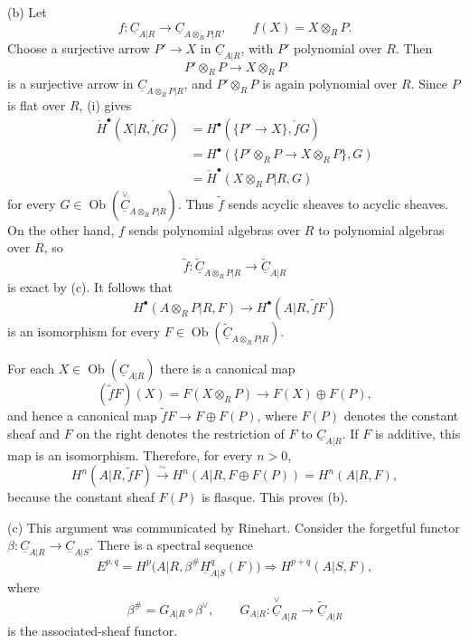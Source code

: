 (b) Let
\[
 f:\underline C_{A|R}\longrightarrow
 \underline C_{A\otimes_RP|R},
 \qquad f(X)=X\otimes_RP.
\]
Choose a surjective arrow $P'\longrightarrow X$ in
$\underline C_{A|R}$, with $P'$ polynomial over $R$. Then
\[
 P'\otimes_RP\longrightarrow X\otimes_RP
\]
is a surjective arrow in $\underline C_{A\otimes_RP|R}$, and
$P'\otimes_RP$ is again polynomial over $R$. Since $P$ is flat
over $R$, (i) gives
\begin{align*}
 \check H^{\bullet}(X|R,\check fG)
 &=H^{\bullet}(\{P'\longrightarrow X\},\check fG)\\
 &=H^{\bullet}(\{P'\otimes_RP\longrightarrow X\otimes_RP\},G)\\
 &=\check H^{\bullet}(X\otimes_RP|R,G)
\end{align*}
for every
$G\in\operatorname{Ob}(\overset{\vee}{\underline C}_{A\otimes_RP|R})$.
Thus $\widetilde f$ sends acyclic sheaves to acyclic sheaves. On
the other hand, $f$ sends polynomial algebras over $R$ to
polynomial algebras over $R$, so
\[
 \widetilde f:\widetilde{\underline C}_{A\otimes_RP|R}
 \longrightarrow\widetilde{\underline C}_{A|R}
\]
is exact by (c). It follows that
\[
 H^{\bullet}(A\otimes_RP|R,F)
 \longrightarrow H^{\bullet}(A|R,\widetilde fF)
\]
is an isomorphism for every
$F\in\operatorname{Ob}(\widetilde{\underline C}_{A\otimes_RP|R})$.

For each $X\in\operatorname{Ob}(\underline C_{A|R})$ there is a
canonical map
\[
 (\widetilde fF)(X)=F(X\otimes_RP)
 \longrightarrow F(X)\oplus F(P),
\]
and hence a canonical map
$\widetilde fF\longrightarrow F\oplus F(P)$, where $F(P)$ denotes
the constant sheaf and $F$ on the right denotes the restriction of
$F$ to $\underline C_{A|R}$. If $F$ is additive, this map is an
isomorphism. Therefore, for every $n>0$,
\[
 H^n(A|R,\widetilde fF)
 \xrightarrow{\ \sim\ }
 H^n(A|R,F\oplus F(P))=H^n(A|R,F),
\]
because the constant sheaf $F(P)$ is flasque. This proves (b).


(c) This argument was communicated by Rinehart. Consider the
forgetful functor
$\beta:\underline C_{A|R}\longrightarrow\underline C_{A|S}$.
There is a spectral sequence
\[
 E^{p,q}=H^p\bigl(A|R,
 \beta^{\#}\underline H^q_{A|S}(F)\bigr)
 \Longrightarrow H^{p+q}(A|S,F),
\]
where
\[
 \beta^{\#}=G_{A|R}\circ\beta^{\vee},
 \qquad
 G_{A|R}:\overset{\vee}{\underline C}_{A|R}
 \longrightarrow\widetilde{\underline C}_{A|R}
\]
is the associated-sheaf functor.

